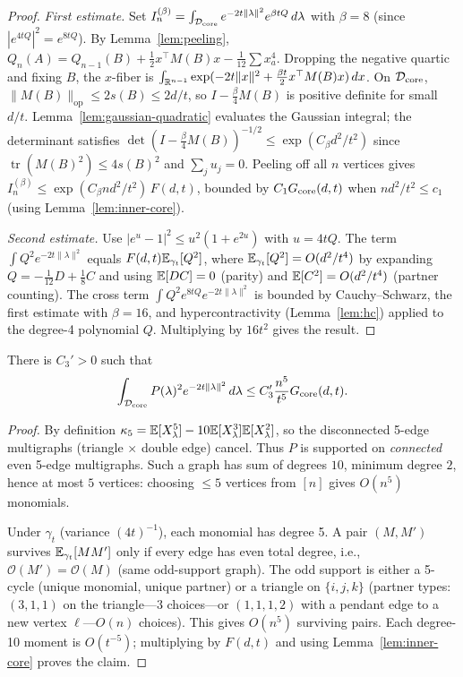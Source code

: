 \begin{proof}\leanok
{}
\emph{First estimate.}
Set $I_n^{(\beta)}=\int_{\mathcal{D}_\mathrm{core}}e^{-2t\|\lambda\|^2}e^{\beta tQ}\,d\lambda$
with $\beta=8$ (since $|e^{4tQ}|^2=e^{8tQ}$).
By Lemma~\ref{lem:peeling}, $Q_n(A)=Q_{n-1}(B)+\frac12 x^\top M(B)x
-\frac{1}{12}\sum x_a^4$.
Dropping the negative quartic and fixing $B$, the $x$-fiber is
$\int_{\mathbb{R}^{n-1}}\exp(-2t\|x\|^2+\frac{\beta t}{2}x^\top M(B)x)\,dx$.
On $\mathcal{D}_\mathrm{core}$, $\|M(B)\|_{\mathrm{op}}\le 2s(B)\le 2d/t$,
so $I-\frac\beta4 M(B)$ is positive definite for small $d/t$.
Lemma~\ref{lem:gaussian-quadratic} evaluates the Gaussian integral;
the determinant satisfies
$\det(I-\frac\beta4 M(B))^{-1/2}\le\exp(C_\beta d^2/t^2)$
since $\operatorname{tr}(M(B)^2)\le 4s(B)^2$ and $\sum_j u_j=0$.
Peeling off all $n$ vertices gives
$I_n^{(\beta)}\le \exp(C_\beta nd^2/t^2)\,F(d,t)$,
bounded by $C_1G_{\mathrm{core}}(d,t)$ when $nd^2/t^2\le c_1$
(using Lemma~\ref{lem:inner-core}).

\emph{Second estimate.}
Use $|e^u-1|^2\le u^2(1+e^{2u})$ with $u=4tQ$.
The term $\int Q^2 e^{-2t\|\lambda\|^2}$ equals
$F(d,t)\mathbb{E}_{\gamma_t}[Q^2]$, where $\mathbb{E}_{\gamma_t}[Q^2]=O(d^2/t^4)$
by expanding $Q=-\frac{1}{12}D+\frac18 C$ and using
$\mathbb{E}[DC]=0$ (parity) and $\mathbb{E}[C^2]=O(d^2/t^4)$ (partner counting).
The cross term $\int Q^2 e^{8tQ}e^{-2t\|\lambda\|^2}$ is bounded
by Cauchy--Schwarz, the first estimate with $\beta=16$, and
hypercontractivity (Lemma~\ref{lem:hc}) applied to the degree-4
polynomial $Q$. Multiplying by $16t^2$ gives the result.
\end{proof}

\begin{lemma}\label{lem:quintic}
\leanok
{}
There is $C_3'>0$ such that
\[
  \int_{\mathcal{D}_\mathrm{core}}P(\lambda)^2 e^{-2t\|\lambda\|^2}\,d\lambda
  \le C_3'\frac{n^5}{t^5}G_{\mathrm{core}}(d,t).
\]
\end{lemma}

\begin{proof}\leanok
{}
By definition $\kappa_5=\mathbb{E}[X_\lambda^5]-10\mathbb{E}[X_\lambda^3]\mathbb{E}[X_\lambda^2]$,
so the disconnected 5-edge multigraphs (triangle $\times$ double edge) cancel.
Thus $P$ is supported on \emph{connected} even 5-edge multigraphs.
Such a graph has sum of degrees $10$, minimum degree $2$, hence at
most $5$ vertices: choosing $\le 5$ vertices from $[n]$ gives $O(n^5)$
monomials.

Under $\gamma_t$ (variance $(4t)^{-1}$), each monomial has degree 5.
A pair $(M,M')$ survives $\mathbb{E}_{\gamma_t}[MM']$ only if every edge
has even total degree, i.e., $\mathcal O(M')=\mathcal O(M)$
(same odd-support graph). The odd support is either a 5-cycle
(unique monomial, unique partner) or a triangle on $\{i,j,k\}$
(partner types: $(3,1,1)$ on the triangle---$3$ choices---or $(1,1,1,2)$
with a pendant edge to a new vertex $\ell$---$O(n)$ choices).
This gives $O(n^5)$ surviving pairs.
Each degree-10 moment is $O(t^{-5})$; multiplying by $F(d,t)$
and using Lemma~\ref{lem:inner-core} proves the claim.
\end{proof}

